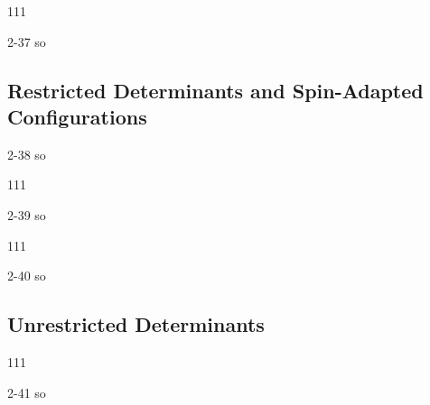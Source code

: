 \documentclass[a4paper]{book}
\begin{document}
	\begin{exercise}
	111
	\end{exercise}
	
	\begin{solution}
		2-37 so
	\end{solution}
	
	\subsection{Restricted Determinants and Spin-Adapted Configurations}
	
	\begin{solution}
		2-38 so
	\end{solution}
	
	\begin{exercise}
	111
	\end{exercise}
	
	\begin{solution}
		2-39 so
	\end{solution}
	
	\begin{exercise}
	111
	\end{exercise}
	
	\begin{solution}
		2-40 so
	\end{solution}
	
	\subsection{Unrestricted Determinants}
	
	\begin{exercise}
	111
	\end{exercise}
	
	\begin{solution}
		2-41 so
	\end{solution}
	
\end{document}

